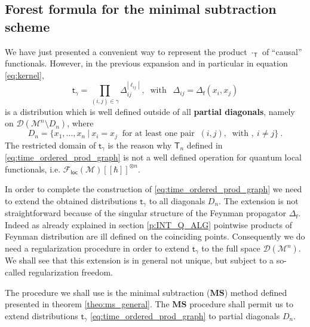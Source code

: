 \documentclass[11pt]{book}
\newcommand{\loc}{\mathsf{loc}}
\newcommand{\MS}{\textbf{MS}}
\newcommand{\abs}[1]{\left|#1\right|}
\newcommand{\Dcal}{\mathcal{D}}
\newcommand{\Fcal}{\mathcal{F}}
\newcommand{\Mcal}{\mathcal{M}}
\newcommand{\Tsf}{\mathsf{T}}
\newcommand{\fsf}{\mathsf{f}}
\newcommand{\tsf}{\mathsf{t}}
\theoremstyle{break}
\begin{document}
\subsection{Forest formula for the minimal subtraction scheme}
\label{p:FOREST FORMULA}


We have just presented a convenient way to represent the product $\cdot_\Tsf$ of ``causal'' functionals. However, in the previous expansion and in particular in equation \eqref{eq:kernel},
%
\begin{equation*}
\tsf_\gamma = \prod_{(i,j)\in\gamma} \Delta_{ij}^{\abs{\ell_{ij}}} \ , \ \mbox{ with } \ \ \Delta_{ij}=\Delta_\fsf(x_i,x_j)
\end{equation*}
%
is a distribution which is well defined outside of all  \textbf{partial diagonals}, namely on $\Dcal(\Mcal^n\setminus D_n)$, where 
%
\begin{equation}
D_n = \left. \bigg\{x_1, \dots , x_n \ \right| \ x_i = x_j \ \text{ for at least one pair } \  (i,j), \ \mbox{ with } , \ i\neq j \bigg\} \ .
\label{eq:partial_diagonals}
\end{equation}
%
The restricted domain of $\tsf_\gamma$ is the reason why $\Tsf_n$ defined in \eqref{eq:time_ordered_prod_graph} is not a well defined operation for quantum local functionals, i.e. $\Fcal_\loc(\Mcal)[[\hbar]]^{\otimes n}$. 


In order to complete the construction of \eqref{eq:time_ordered_prod_graph} we need to extend the obtained distributions $\tsf_\gamma$ to all diagonals $D_n$. The extension is not  straightforward because of the singular structure of the Feynman propagator $\Delta_\fsf$. Indeed as already explained in section \ref{p:INT_Q_ALG} pointwise products of Feynman distribution are ill defined on the coinciding points. Consequently we do need a regularization procedure in order to extend $\tsf_\gamma$ to the full space $\Dcal(\Mcal^n)$. We shall see that this extension is in general not unique, but subject to a so-called regularization freedom.


\bigskip


The procedure we shall use is the minimal subtraction ($\MS$) method defined presented in theorem \ref{theo:ms_general}. The $\MS$ procedure shall permit us to extend distributions $\tsf_\gamma$ \eqref{eq:time_ordered_prod_graph} to partial diagonals $D_n$. 
\end{document}
